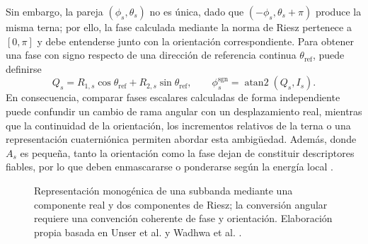 Sin embargo, la pareja $(\phi_s,\theta_s)$ no es única, dado que $(-\phi_s,\theta_s+\pi)$ produce la misma terna; por ello, la fase calculada mediante la norma de Riesz pertenece a $[0,\pi]$ y debe entenderse junto con la orientación correspondiente. Para obtener una fase con signo respecto de una dirección de referencia continua $\theta_{\mathrm{ref}}$, puede definirse
\begin{equation}
 Q_s=R_{1,s}\cos\theta_{\mathrm{ref}}+R_{2,s}\sin\theta_{\mathrm{ref}},
 \qquad \phi_s^{\mathrm{sgn}}=\operatorname{atan2}(Q_s,I_s).
 \label{eq:piramides_fase_riesz_signo}
\end{equation}
En consecuencia, comparar fases escalares calculadas de forma independiente puede confundir un cambio de rama angular con un desplazamiento real, mientras que la continuidad de la orientación, los incrementos relativos de la terna o una representación cuaterniónica permiten abordar esta ambigüedad. Además, donde $A_s$ es pequeña, tanto la orientación como la fase dejan de constituir descriptores fiables, por lo que deben enmascararse o ponderarse según la energía local \cite{wadhwa2014riesz}.

\begin{figure}[htbp]
\centering
{}
\caption[Representación monogénica de una subbanda]{Representación monogénica de una subbanda mediante una componente real y dos componentes de Riesz; la conversión angular requiere una convención coherente de fase y orientación. Elaboración propia basada en Unser et al. y Wadhwa et al. \cite{unser2009monogenic,wadhwa2014riesz}.}
\label{fig:piramides_riesz_componentes}
\end{figure}

